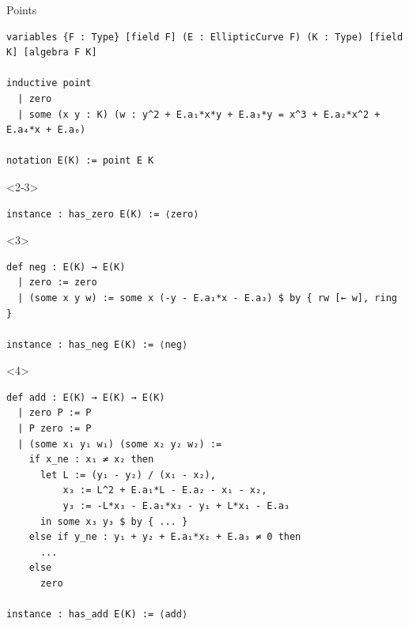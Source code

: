 \documentclass[10pt]{beamer}
\begin{document}
\begin{frame}[fragile, t]{Points}

\begin{lstlisting}[basicstyle=\scriptsize, frame=single]
variables {F : Type} [field F] (E : EllipticCurve F) (K : Type) [field K] [algebra F K]

inductive point
  | zero
  | some (x y : K) (w : y^2 + E.a₁*x*y + E.a₃*y = x^3 + E.a₂*x^2 + E.a₄*x + E.a₆)

notation E(K) := point E K
\end{lstlisting}


\begin{onlyenv}<2-3>
\begin{lstlisting}[basicstyle=\scriptsize, frame=single]
instance : has_zero E(K) := ⟨zero⟩
\end{lstlisting}
\end{onlyenv}


\begin{onlyenv}<3>
\begin{lstlisting}[basicstyle=\scriptsize, frame=single]
def neg : E(K) → E(K)
  | zero := zero
  | (some x y w) := some x (-y - E.a₁*x - E.a₃) $ by { rw [← w], ring }

instance : has_neg E(K) := ⟨neg⟩
\end{lstlisting}
\end{onlyenv}


\begin{onlyenv}<4>
\begin{lstlisting}[basicstyle=\scriptsize, frame=single]
def add : E(K) → E(K) → E(K)
  | zero P := P
  | P zero := P
  | (some x₁ y₁ w₁) (some x₂ y₂ w₂) :=
    if x_ne : x₁ ≠ x₂ then
      let L := (y₁ - y₂) / (x₁ - x₂),
          x₃ := L^2 + E.a₁*L - E.a₂ - x₁ - x₂,
          y₃ := -L*x₃ - E.a₁*x₃ - y₁ + L*x₁ - E.a₃
      in some x₃ y₃ $ by { ... }
    else if y_ne : y₁ + y₂ + E.a₁*x₂ + E.a₃ ≠ 0 then
      ...
    else
      zero

instance : has_add E(K) := ⟨add⟩
\end{lstlisting}
\end{onlyenv}



\end{frame}
\end{document}

